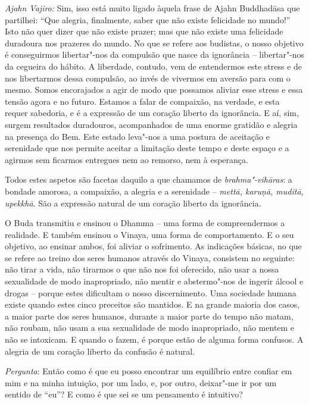 \emph{Ajahn Vajiro:} Sim, isso está muito ligado àquela frase de Ajahn
Buddhadāsa que partilhei: ``Que alegria, finalmente, saber que não existe
felicidade no mundo!'' Isto não quer dizer que não existe prazer; mas que não
existe uma felicidade duradoura nos prazeres do mundo. No que se refere aos
budistas, o nosso objetivo é conseguirmos libertar"-nos da compulsão que nasce da
ignorância -- libertar"-nos da cegueira do hábito. A liberdade, contudo, vem de
entendermos este stress e de nos libertarmos dessa compulsão, ao invés de
vivermos em aversão para com o mesmo. Somos encorajados a agir de modo que
possamos aliviar esse stress e essa tensão agora e no futuro. Estamos a falar de
compaixão, na verdade, e esta requer sabedoria, e é a expressão de um coração
liberto da ignorância. E aí, sim, surgem resultados duradouros, acompanhados de
uma enorme gratidão e alegria na presença do Bem. Este estado leva"-nos a uma
postura de aceitação e serenidade que nos permite aceitar a limitação deste
tempo e deste espaço e a agirmos sem ficarmos entregues nem ao remorso, nem à
esperança.

Todos estes aspetos são facetas daquilo a que chamamos de \emph{brahma"-vihāras}:
a bondade amorosa, a compaixão, a alegria e a serenidade -- \emph{mettā, karuṇā,
  muditā, upekkhā}. São a expressão natural de um coração liberto da ignorância.

O Buda transmitiu e ensinou o Dhamma -- uma forma de compreendermos a realidade.
E também ensinou o Vinaya, uma forma de comportamento. E o seu objetivo, ao
ensinar ambos, foi aliviar o sofrimento. As indicações básicas, no que se refere
ao treino dos seres humanos através do Vinaya, consistem no seguinte: não tirar a
vida, não tirarmos o que não nos foi oferecido, não usar a nossa sexualidade de
modo inapropriado, não mentir e abstermo"-nos de ingerir álcool e drogas --
porque estes dificultam o nosso discernimento. Uma sociedade humana existe
quando estes cinco preceitos são mantidos. E na grande maioria dos casos, a
maior parte dos seres humanos, durante a maior parte do tempo não matam, não
roubam, não usam a sua sexualidade de modo inapropriado, não mentem e não se
intoxicam. E quando o fazem, é porque estão de alguma forma confusos. A alegria
de um coração liberto da confusão é natural.

\bigskip

\emph{Pergunta}: Então como é que eu posso encontrar um equilíbrio entre confiar
em mim e na minha intuição, por um lado, e, por outro, deixar"-me ir por um
sentido de ``eu''? E como é que sei se um pensamento é intuitivo?

